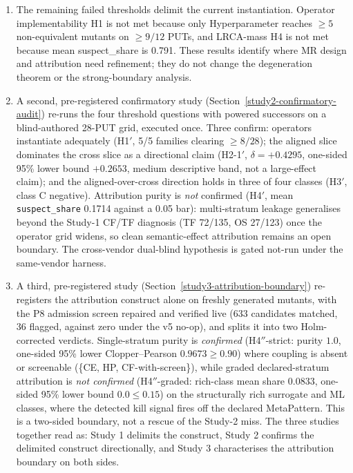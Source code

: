 \documentclass[manuscript,screen,review]{acmart}
\begin{document}
\begin{enumerate}
  shows only a modest aggregate kill-rate advantage
  over literature-generic baselines, and non-nesting
  cases remain in both directions. Thus kill-rate, semantic-stratum
  alignment, and
  real-defect detection should be interpreted as related but distinct
  constructs, on industrial code and not only on the controlled kernels.
\item
  The remaining failed thresholds delimit the current instantiation.
  Operator implementability H1 is not met because only Hyperparameter
  reaches \(\geq 5\) non-equivalent mutants on \(\geq 9/12\) PUTs, and
  LRCA-mass H4 is not met because mean suspect\_share is 0.791. These
  results identify where MR design and attribution need refinement; they
  do not change the degeneration theorem or the strong-boundary
  analysis.
\item
  A second, pre-registered confirmatory study
  (Section~\ref{study2-confirmatory-audit}) re-runs the four threshold
  questions with powered successors on a blind-authored 28-PUT grid,
  executed once. Three confirm: operators instantiate adequately (H1\('\),
  5/5 families clearing \(\geq 8/28\)); the aligned slice dominates the
  cross slice as a directional claim (H2-1\('\), \(\delta = +0.4295\),
  one-sided 95\% lower bound \(+0.2653\), medium descriptive band, not a
  large-effect claim); and the aligned-over-cross direction holds in three
  of four classes (H3\('\), class C negative). Attribution purity is
  \emph{not} confirmed (H4\('\), mean \texttt{suspect\_share} 0.1714
  against a 0.05 bar): multi-stratum leakage generalises beyond the
  Study-1 CF/TF diagnosis (TF 72/135, OS 27/123) once the operator grid
  widens, so clean semantic-effect attribution remains an open boundary.
  The cross-vendor dual-blind hypothesis is gated not-run under the
  same-vendor harness.
\item
  A third, pre-registered study (Section~\ref{study3-attribution-boundary})
  re-registers the attribution construct alone on freshly generated mutants,
  with the P8 admission screen repaired and verified live (633 candidates
  matched, 36 flagged, against zero under the v5 no-op), and splits it into two
  Holm-corrected verdicts. Single-stratum purity is \emph{confirmed}
  (H4\('' \)-strict: purity \(1.0\), one-sided 95\% lower Clopper--Pearson
  \(0.9673 \geq 0.90\)) where coupling is absent or screenable
  (\{CE, HP, CF-with-screen\}), while graded declared-stratum attribution is
  \emph{not confirmed} (H4\('' \)-graded: rich-class mean share \(0.0833\),
  one-sided 95\% lower bound \(0.0 \leq 0.15\)) on the structurally rich
  surrogate and ML classes, where the detected kill signal fires off the
  declared MetaPattern. This is a two-sided boundary, not a rescue of the
  Study-2 miss. The three studies together read as: Study 1 delimits the
  construct, Study 2 confirms the delimited construct directionally, and Study 3
  characterises the attribution boundary on both sides.
\end{enumerate}
\end{document}
